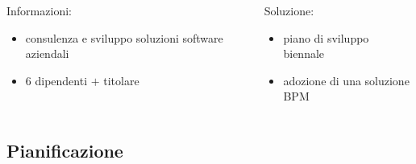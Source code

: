 \documentclass[compress,9pt,handout]{beamer}
\newcommand{\sw}{\foreignlanguage{english}{software}\xspace}
\begin{document}
\begin{frame}
\begin{columns}
{\begin{block}{Informazioni:}
  \begin{itemize}
    \item consulenza e sviluppo soluzioni \sw aziendali
    \item 6 dipendenti $+$ titolare
  \end{itemize}
\end{block}

\begin{center}
\end{center}

\begin{exampleblock}{Soluzione:}
\begin{itemize}
  \item piano di sviluppo biennale
  \item adozione di una soluzione BPM
\end{itemize}
\end{exampleblock}
\vspace{-10pt}
}

\end{columns}
\end{frame}

\subsection{Pianificazione}
\end{document}
